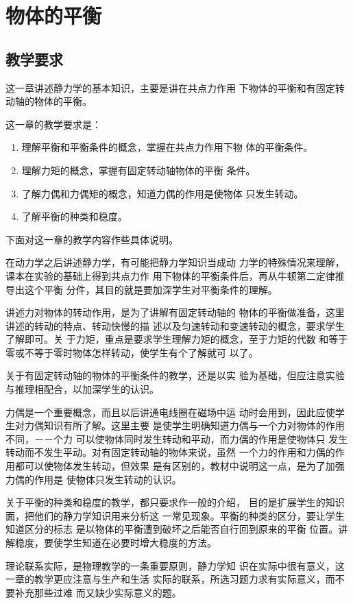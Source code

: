 
\chapter{物体的平衡}\minitoc[n]
\section{教学要求}
这一章讲述静力学的基本知识，主要是讲在共点力作用
下物体的平衡和有固定转动轴的物体的平衡。

这一章的教学要求是：
\begin{enumerate}
\item 理解平衡和平衡条件的概念，掌握在共点力作用下物
体的平衡条件。
\item 理解力矩的概念，掌握有固定转动轴物体的平衡
条件。
\item 了解力偶和力偶矩的概念，知道力偶的作用是使物体
只发生转动。
\item 了解平衡的种类和稳度。
\end{enumerate}

下面对这一章的教学内容作些具体说明。

在动力学之后讲述静力学，有可能把静力学知识当成动
力学的特殊情况来理解，课本在实验的基础上得到共点力作
用下物体的平衡条件后，再从牛顿第二定律推导出这个平衡
分件，其目的就是要加深学生对平衡条件的理解。

讲述力对物体的转动作用，是为了讲解有固定转动轴的
物体的平衡做准备，这里讲述的转动的特点、转动快慢的描
述以及匀速转动和变速转动的概念，要求学生了解即可。关
于力矩，重点是要求学生理解力矩的概念，至于力矩的代数
和等于零或不等于零时物体怎样转动，使学生有个了解就可
以了。

关于有固定转动轴的物体的平衡条件的教学，还是以实
验为基础，但应注意实验与推理相配合，以加深学生的认识。

力偶是一个重要概念，而且以后讲通电线圈在磁场中运
动时会用到，因此应使学生对力偶知识有所了解。这里主要
是使学生明确知道力偶与一个力对物体的作用不同，－－个力
可以使物体同时发生转动和平动，而力偶的作用是使物体只
发生转动而不发生平动。对有固定转动轴的物体来说，虽然
一个力的作用和力偶的作用都可以使物体发生转动，但效果
是有区别的，教材中说明这一点，是为了加强力偶的作用是
使物体只发生转动的认识。

关于平衡的种类和稳度的教学，都只要求作一般的介绍，
目的是扩展学生的知识面，把他们的静力学知识用来分析这
一常见现象。平衡的种类的区分，要让学生知道区分的标志
是以物体的平衡遭到破坏之后能否自行回到原来的平衡
位置。讲解稳度，要使学生知道在必要时增大稳度的方法。

理论联系实际，是物理教学的一条重要原则，静力学知
识在实际中很有意义，这一章的教学更应注意与生产和生活
实际的联系，所选习题力求有实际意义，而不要补充那些过难
而又缺少实际意义的题。

